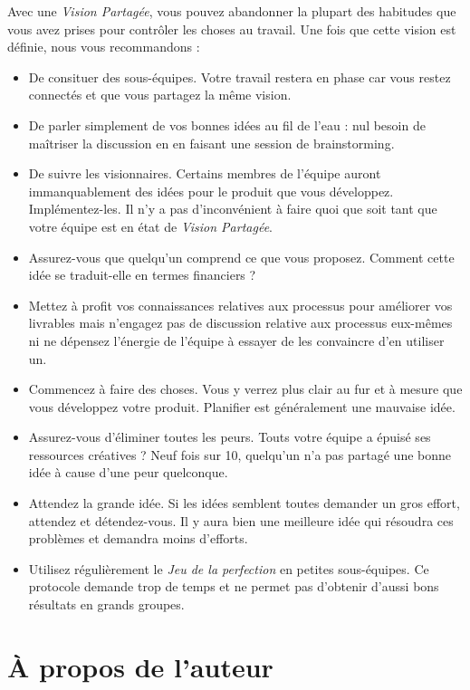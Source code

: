 \documentclass[paper=6in:9in,pagesize=pdftex,headinclude=on,footinclude=on,11pt]{scrbook}
\begin{document}
Avec une \emph{Vision Partagée}, vous pouvez abandonner la plupart des habitudes que vous avez prises pour
contrôler les choses au travail. Une fois que cette vision est définie, nous vous recommandons :
\begin{itemize}
	\item De consituer des sous-équipes. Votre travail restera en phase car vous restez connectés et que
	      vous partagez la même vision.
	\item De parler simplement de vos bonnes idées au fil de l'eau : nul besoin de maîtriser la discussion
	      en en faisant une session de \og{}brainstorming\fg{}.
	\item De suivre les visionnaires. Certains membres de l'équipe auront immanquablement des idées pour
	      le produit que vous développez. Implémentez-les. Il n'y a pas d'inconvénient à faire quoi que soit
	      tant que votre équipe est en état de \emph{Vision Partagée}.
	\item Assurez-vous que quelqu'un comprend ce que vous proposez. Comment cette idée se traduit-elle en
	      termes financiers ?
	\item Mettez à profit vos connaissances relatives aux processus pour améliorer vos livrables mais
	      n'engagez pas de discussion relative aux processus eux-mêmes ni ne dépensez l'énergie de l'équipe
	      à essayer de les convaincre d'en utiliser un.
	\item Commencez à faire des choses. Vous y verrez plus clair au fur et à mesure que vous développez
	      votre produit. \og{}Planifier\fg{} est généralement une mauvaise idée.
	\item Assurez-vous d'éliminer toutes les peurs. Touts votre équipe a épuisé ses ressources créatives ?
	      Neuf fois sur 10, quelqu'un n'a pas partagé une bonne idée à cause d'une peur quelconque.
	\item Attendez la grande idée. Si les idées semblent toutes demander un gros effort, attendez et
	      détendez-vous. Il y aura bien une meilleure idée qui résoudra ces problèmes et demandra
	      moins d'efforts.
	\item Utilisez régulièrement le \emph{Jeu de la perfection} en petites sous-équipes. Ce protocole
	      demande trop de temps et ne permet pas d'obtenir d'aussi bons résultats en grands groupes.
\end{itemize}

\chapter*{À propos de l'auteur}
\end{document}
